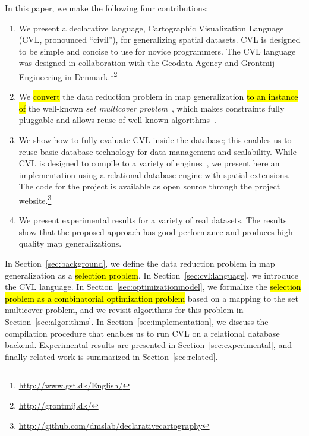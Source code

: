 In this paper, we make the following four contributions:
\begin{enumerate}
\item We present a declarative language, Cartographic Visualization Language (CVL, pronounced ``civil''), for generalizing spatial datasets. CVL is designed to be simple and concise to use for novice programmers. The CVL language was designed in collaboration with the Geodata Agency and Grontmij Engineering in Denmark.\footnote{\url{http://www.gst.dk/English/}}\footnote{\url{http://grontmij.dk/}}

\item We \hl{convert} the data reduction problem in map generalization \hl{to an instance of} the well-known \emph{set multicover problem}~\cite{rajagopalan1998primal}, which makes constraints fully pluggable and allows reuse of well-known algorithms~\cite{rajagopalan1998primal,vazirani2001approximation}.

\item We show how to fully evaluate CVL inside the database; this enables us to reuse basic database technology for data management and scalability. While CVL is designed to compile to a variety of engines~\cite{Stonebraker:2010:PDBMSvsMapReduce}, we present here an implementation using a relational database engine with spatial extensions. The code for the project is available as open source through the project website.\footnote{\url{http://github.com/dmslab/declarativecartography}}

\item We present experimental results for a variety of real datasets. The results show that the proposed approach has good performance and produces high-quality map generalizations.
\end{enumerate}

In Section~\ref{sec:background}, we define the data reduction problem in map generalization as a \hl{selection problem}. In Section~\ref{sec:cvl:language}, we introduce the CVL language. In Section~\ref{sec:optimizationmodel}, we formalize the \hl{selection problem as a combinatorial optimization problem} based on a mapping to the set multicover problem, and we revisit algorithms for this problem in Section~\ref{sec:algorithms}. In Section~\ref{sec:implementation}, we discuss the compilation procedure that enables us to run CVL on a relational database backend. Experimental results are presented in Section~\ref{sec:experimental}, and finally related work is summarized in Section~\ref{sec:related}.
